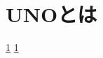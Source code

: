 \documentclass[11pt]{ltjsarticle}
\begin{document}
\section{UNOとは}
\label{ゲーム準備}

\ref{ゲーム準備}
\ref{ゲーム準備}
\end{document}
